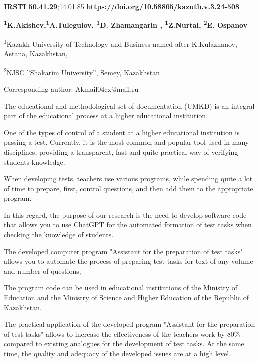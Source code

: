 \newpage
{\bfseries IRSTI 50.41.29};14.01.85
\hfill {\bfseries \href{https://doi.org/10.58805/kazutb.v.3.24-508}{https://doi.org/10.58805/kazutb.v.3.24-508}}


\begin{center}
{\bfseries \textsuperscript{1}K.Akishev\envelope,\textsuperscript{1}A.Тulegulov,
\textsuperscript{1}D. Zhamangarin , \textsuperscript{1}Z.Nurtai,
\textsuperscript{2}E. Ospanov}

\textsuperscript{1}Kazakh University of Technology and Business named
after K.Kulazhanov, Astana, Kazakhstan,

\textsuperscript{2}NJSC ''Shakarim University'', Semey, Kazakhstan
\end{center}
\envelope Corresponding author: Akmail04cx@mail.ru \vspace{0.5cm}

The educational and methodological set of documentation (UMKD) is an
integral part of the educational process at a higher educational
institution.

One of the types of control of a student at a higher educational
institution is passing a test. Currently, it is the most common and
popular tool used in many disciplines, providing a transparent, fast and
quite practical way of verifying students\textquotesingle{} knowledge.

When developing tests, teachers use various programs, while spending
quite a lot of time to prepare, first, control questions, and then add
them to the appropriate program.

In this regard, the purpose of our research is the need to develop
software code that allows you to use ChatGPT for the automated formation
of test tasks when checking the knowledge of students.

The developed computer program "Assistant for the preparation of test
tasks" allows you to automate the process of preparing test tasks for
text of any volume and number of questions;

The program code can be used in educational institutions of the Ministry
of Education and the Ministry of Science and Higher Education of the
Republic of Kazakhstan.

The practical application of the developed program "Assistant for the
preparation of test tasks" allows to increase the effectiveness of the
teacher\textquotesingle s work by 80\% compared to existing analogues
for the development of test tasks. At the same time, the quality and
adequacy of the developed issues are at a high level.

